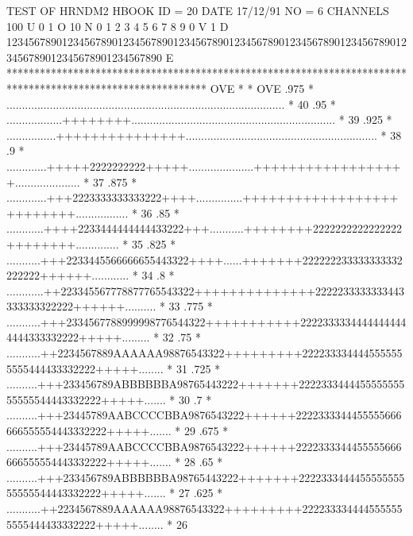\begin{Listing}
 TEST OF HRNDM2                                                                  
 HBOOK     ID =        20                                        DATE  17/12/91              NO =   6
 CHANNELS 100 U 0                                                                                                  1 O 
           10 N 0        1         2         3         4         5         6         7         8         9         0 V 
            1 D 1234567890123456789012345678901234567890123456789012345678901234567890123456789012345678901234567890 E 
            ************************************************************************************************************
   OVE      *                                                                                                          * OVE
      .975  *             ..........................................................................................   *  40
      .95   *           ..................++++++++..................................................................   *  39
      .925  *          ................+++++++++++++++..............................................................   *  38
      .9    *          .............+++++2222222222+++++.....................++++++++++++++++++.....................   *  37
      .875  *         .............+++2223333333333222++++...............++++++++++++++++++++++++++.................   *  36
      .85   *        ............++++2233444444444433222+++...........++++++++2222222222222222++++++++..............   *  35
      .825  *        ...........+++2233445566666655443322++++......+++++++222222233333333332222222++++++............   *  34
      .8    *       ............++223345567778877765543322++++++++++++++2222233333333443333333322222++++++..........   *  33
      .775  *       ...........+++2334567788999998776544322+++++++++++22223333344444444444444333332222+++++.........   *  32
      .75   *       ...........++2234567889AAAAAA98876543322+++++++++2222333344445555555555444433332222+++++........   *  31
      .725  *       ..........+++233456789ABBBBBBA98765443222+++++++222233344445555555555555544443332222+++++.......   *  30
      .7    *       ..........+++23445789AABCCCCBBA9876543222++++++2222333344455555666666555554443332222+++++.......   *  29
      .675  *       ..........+++23445789AABCCCCBBA9876543222++++++2222333344455555666666555554443332222+++++.......   *  28
      .65   *       ..........+++233456789ABBBBBBA98765443222+++++++222233344445555555555555544443332222+++++.......   *  27
      .625  *       ...........++2234567889AAAAAA98876543322+++++++++2222333344445555555555444433332222+++++........   *  26

\end{Listing}
